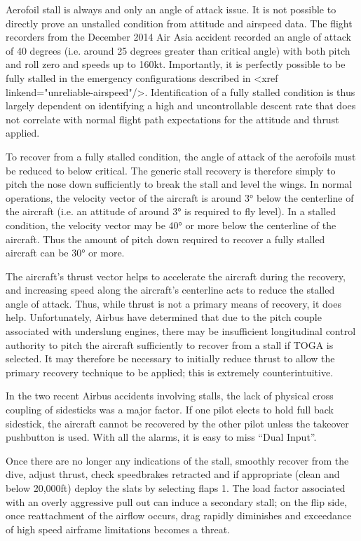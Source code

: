 \documentclass[a5paper,11pt,twoside]{book}
\begin{document}
Aerofoil stall is always and only an angle of attack issue. It is not possible
to directly prove an unstalled condition from attitude and airspeed data. The
flight recorders from the December 2014 Air Asia accident recorded an angle of
attack of 40 degrees (i.e. around 25 degrees greater than critical angle) with
both pitch and roll zero and speeds up to 160kt. Importantly, it is perfectly
possible to be fully stalled in the emergency configurations described in <xref
linkend="unreliable-airspeed"/>. Identification of a fully stalled condition is
thus largely dependent on identifying a high and uncontrollable descent rate
that does not correlate with normal flight path expectations for the attitude
and thrust applied.

To recover from a fully stalled condition, the angle of attack of the aerofoils
must be reduced to below critical. The generic stall recovery is therefore
simply to pitch the nose down sufficiently to break the stall and level the
wings. In normal operations, the velocity vector of the aircraft is around 3°
below the centerline of the aircraft (i.e. an attitude of around 3° is required
to fly level). In a stalled condition, the velocity vector may be 40° or more
below the centerline of the aircraft. Thus the amount of pitch down required to
recover a fully stalled aircraft can be 30° or more.

The aircraft’s thrust vector helps to accelerate the aircraft during the
recovery, and increasing speed along the aircraft’s centerline acts to reduce
the stalled angle of attack. Thus, while thrust is not a primary means of
recovery, it does help. Unfortunately, Airbus have determined that due to the
pitch couple associated with underslung engines, there may be insufficient
longitudinal control authority to pitch the aircraft sufficiently to recover
from a stall if TOGA is selected. It may therefore be necessary to initially
reduce thrust to allow the primary recovery technique to be applied; this is
extremely counterintuitive.

In the two recent Airbus accidents involving stalls, the lack of physical cross
coupling of sidesticks was a major factor. If one pilot elects to hold full back
sidestick, the aircraft cannot be recovered by the other pilot unless the
takeover pushbutton is used. With all the alarms, it is easy to miss “Dual
Input”.

Once there are no longer any indications of the stall, smoothly recover from the
dive, adjust thrust, check speedbrakes retracted and if appropriate (clean and
below 20,000ft) deploy the slats by selecting flaps 1. The load factor
associated with an overly aggressive pull out can induce a secondary stall; on
the flip side, once reattachment of the airflow occurs, drag rapidly diminishes
and exceedance of high speed airframe limitations becomes a threat.
\end{document}
